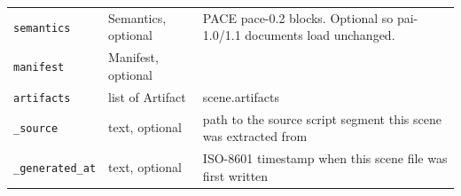 \begin{longtable}{@{}R{0.24\textwidth}R{0.21\textwidth}R{0.49\textwidth}@{}}
\texttt{semantics} & Semantics, optional & PACE pace-0.2 blocks. Optional so pai-1.0/\allowbreak{}1.1 documents load unchanged. \\
\texttt{manifest} & Manifest, optional &  \\
\texttt{artifacts} & list of Artifact & scene.artifacts \\
\texttt{\_\allowbreak source} & text, optional & path to the source script segment this scene was extracted from \\
\texttt{\_\allowbreak generated\_\allowbreak at} & text, optional & ISO-8601 timestamp when this scene file was first written \\
\bottomrule
\end{longtable}
